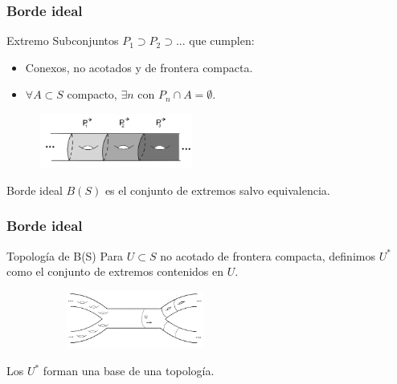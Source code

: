 \documentclass{beamer}
\begin{document}
\begin{frame}
\frametitle{Borde ideal}
\begin{block}
{Extremo}
Subconjuntos $P_1 \supset P_2 \supset ...$ que cumplen:
\begin{itemize}
\item Conexos, no acotados y de frontera compacta.
\item $\forall A\subset S$ compacto, $\exists n$ con $P_n \cap A = \emptyset$.
\end{itemize}

\begin{figure}[htb]
\begin{center}
\includegraphics[width=2in,height=0.7in]{imagenes/final.png} 
\end{center}
\end{figure}
\end{block}


\begin{block}{Borde ideal}
$B(S)$ es el conjunto de extremos salvo equivalencia.
\end{block}
\end{frame}


\begin{frame}
\frametitle{Borde ideal}
\begin{block}
{Topología de B(S)}
Para $U \subset S$ no acotado de frontera compacta, definimos $U^*$ como el conjunto de extremos contenidos en $U$. 
\begin{figure}[htb]
\begin{center}
\includegraphics[width=2.5in,height=0.75in]{imagenes/diapoX.png} 
\end{center}
\end{figure}

Los $U^*$ forman una base de una topología.
\end{block}

\end{frame}
\end{document}
